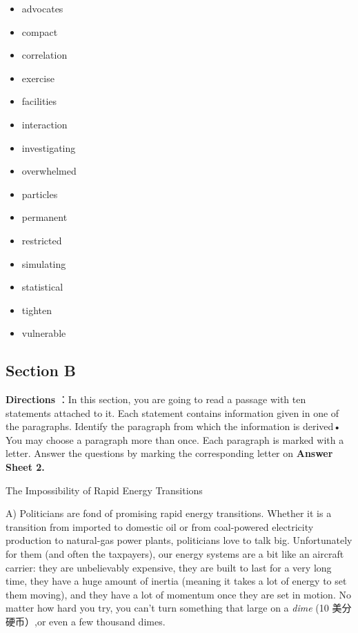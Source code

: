 \documentclass[UTF8,11pt]{ctexart}
\begin{document}
\begin{itemize}[leftmargin=2em,itemsep=.2em,topsep=.4em]\item[A.] advocates
\item[B.] compact
\item[C.] correlation
\item[D.] exercise
\item[E.] facilities
\item[F.] interaction
\item[G.] investigating
\item[H.] overwhelmed
\item[I.] particles
\item[J.] permanent
\item[K.] restricted
\item[L.] simulating
\item[M.] statistical
\item[N.] tighten
\item[O.] vulnerable
\end{itemize}

\subsection*{\textbf{Section B}}


\textbf{Directions} ：In this section, you are going to read a passage with ten statements attached to it. Each statement contains information given in one of the paragraphs. Identify the paragraph from which the information is derived• You may choose a paragraph more than once. Each paragraph is marked with a letter. Answer the questions by marking the corresponding letter on \textbf{Answer Sheet 2.}


The Impossibility of Rapid Energy Transitions


A) Politicians are fond of promising rapid energy transitions. Whether it is a transition from imported to domestic oil or from coal-powered electricity production to natural-gas power plants, politicians love to talk big. Unfortunately for them (and often the taxpayers), our energy systems are a bit like an aircraft carrier: they are unbelievably expensive, they are built to last for a very long time, they have a huge amount of inertia (meaning it takes a lot of energy to set them moving), and they have a lot of momentum once they are set in motion. No matter how hard you try, you can’t turn something that large on a \textit{dime} (10 美分硬币）,or even a few thousand dimes.
\end{document}
